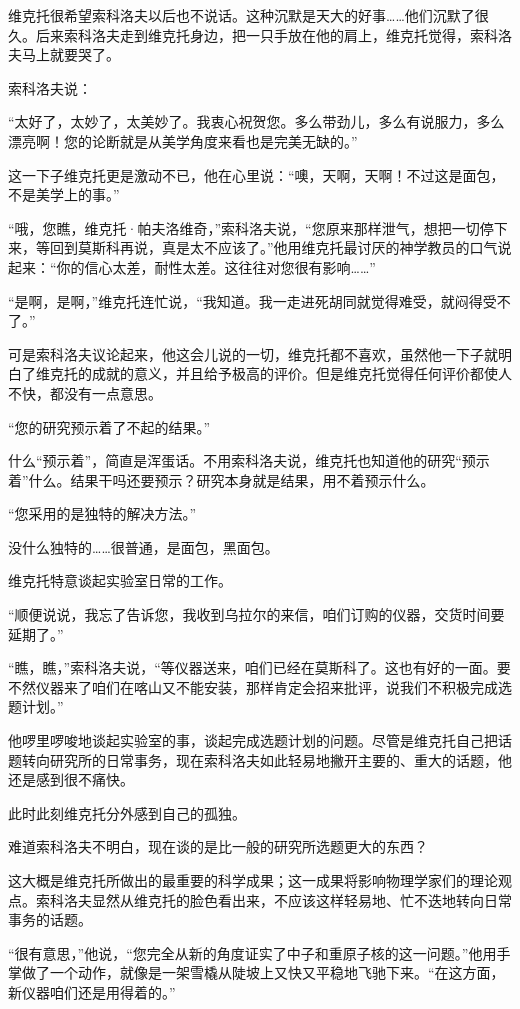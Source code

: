 维克托很希望索科洛夫以后也不说话。这种沉默是天大的好事……他们沉默了很久。后来索科洛夫走到维克托身边，把一只手放在他的肩上，维克托觉得，索科洛夫马上就要哭了。

索科洛夫说：

“太好了，太妙了，太美妙了。我衷心祝贺您。多么带劲儿，多么有说服力，多么漂亮啊！您的论断就是从美学角度来看也是完美无缺的。”

这一下子维克托更是激动不已，他在心里说：“噢，天啊，天啊！不过这是面包，不是美学上的事。”

“哦，您瞧，维克托·帕夫洛维奇，”索科洛夫说，“您原来那样泄气，想把一切停下来，等回到莫斯科再说，真是太不应该了。”他用维克托最讨厌的神学教员的口气说起来：“你的信心太差，耐性太差。这往往对您很有影响……”

“是啊，是啊，”维克托连忙说，“我知道。我一走进死胡同就觉得难受，就闷得受不了。”

可是索科洛夫议论起来，他这会儿说的一切，维克托都不喜欢，虽然他一下子就明白了维克托的成就的意义，并且给予极高的评价。但是维克托觉得任何评价都使人不快，都没有一点意思。

“您的研究预示着了不起的结果。”

什么“预示着”，简直是浑蛋话。不用索科洛夫说，维克托也知道他的研究“预示着”什么。结果干吗还要预示？研究本身就是结果，用不着预示什么。

“您采用的是独特的解决方法。”

没什么独特的……很普通，是面包，黑面包。

维克托特意谈起实验室日常的工作。

“顺便说说，我忘了告诉您，我收到乌拉尔的来信，咱们订购的仪器，交货时间要延期了。”

“瞧，瞧，”索科洛夫说，“等仪器送来，咱们已经在莫斯科了。这也有好的一面。要不然仪器来了咱们在喀山又不能安装，那样肯定会招来批评，说我们不积极完成选题计划。”

他啰里啰唆地谈起实验室的事，谈起完成选题计划的问题。尽管是维克托自己把话题转向研究所的日常事务，现在索科洛夫如此轻易地撇开主要的、重大的话题，他还是感到很不痛快。

此时此刻维克托分外感到自己的孤独。

难道索科洛夫不明白，现在谈的是比一般的研究所选题更大的东西？

这大概是维克托所做出的最重要的科学成果；这一成果将影响物理学家们的理论观点。索科洛夫显然从维克托的脸色看出来，不应该这样轻易地、忙不迭地转向日常事务的话题。

“很有意思，”他说，“您完全从新的角度证实了中子和重原子核的这一问题。”他用手掌做了一个动作，就像是一架雪橇从陡坡上又快又平稳地飞驰下来。“在这方面，新仪器咱们还是用得着的。”

